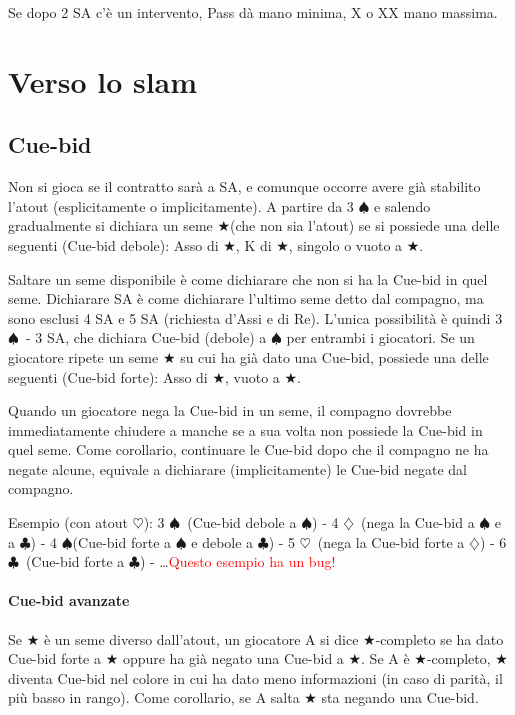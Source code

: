 \documentclass[a4paper,10pt]{article}
\renewcommand{\c}{$\clubsuit$\xspace}
\renewcommand{\d}{$\diamondsuit$\xspace}
\newcommand{\h}{$\heartsuit$\xspace}
\newcommand{\s}{$\spadesuit$\xspace}
\renewcommand{\j}{$\bigstar$\xspace}
\newcommand{\sa}{SA\xspace}
\newcommand{\note}[1]{\textcolor{red}{#1}}
\begin{document}
\noindent Se dopo 2 \sa c'è un intervento, Pass dà mano minima, X o XX mano massima.



\pagebreak

\section{Verso lo slam}

\subsection{Cue-bid}

Non si gioca se il contratto sarà a SA, e comunque occorre avere già stabilito l'atout (esplicitamente o implicitamente). A partire da 3 \s e salendo gradualmente si dichiara un seme \j (che non sia l'atout) se si possiede una delle seguenti (Cue-bid debole): Asso di \j, K di \j, singolo o vuoto a \j.

Saltare un seme disponibile è come dichiarare che non si ha la Cue-bid in quel seme. Dichiarare SA è come dichiarare l'ultimo seme detto dal compagno, ma sono esclusi 4 SA e 5 SA (richiesta d'Assi e di Re). L'unica possibilità è quindi 3 \s\ - 3 SA, che dichiara Cue-bid (debole) a \s per entrambi i giocatori. Se un giocatore ripete un seme \j su cui ha già dato una Cue-bid, possiede una delle seguenti (Cue-bid forte): Asso di \j, vuoto a \j.

Quando un giocatore nega la Cue-bid in un seme, il compagno dovrebbe immediatamente chiudere a manche se a sua volta non possiede la Cue-bid in quel seme.
Come corollario, continuare le Cue-bid dopo che il compagno ne ha negate alcune, equivale a dichiarare (implicitamente) le Cue-bid negate dal compagno.

Esempio (con atout \h): 3 \s\  (Cue-bid debole a \s) - 4 \d\ (nega la Cue-bid a \s e a \c) - 4 \s (Cue-bid forte a \s e debole a \c) - 5 \h\ (nega la Cue-bid forte a \d) - 6 \c\ (Cue-bid forte a \c) - \dots \note{Questo esempio ha un bug!}

\paragraph{Cue-bid avanzate} Se \j è un seme diverso dall'atout, un giocatore A si dice \j-completo se ha dato Cue-bid forte a \j oppure ha già negato una Cue-bid a \j. Se A è \j-completo, \j diventa Cue-bid nel colore in cui ha dato meno informazioni (in caso di parità, il più basso in rango). Come corollario, se A salta \j sta negando una Cue-bid.
\vspace{4mm}
\end{document}
